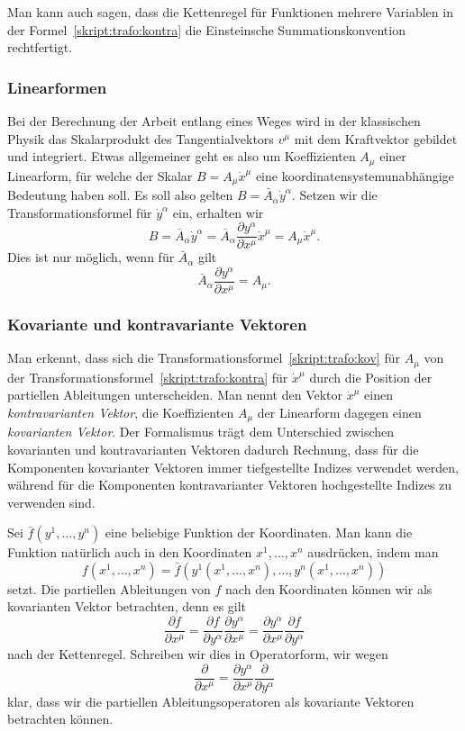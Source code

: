 Man kann auch sagen, dass die Kettenregel für Funktionen mehrere Variablen
in der Formel~\eqref{skript:trafo:kontra}
die Einsteinsche Summationskonvention rechtfertigt.

\subsubsection{Linearformen}
Bei der Berechnung der Arbeit entlang eines Weges wird in der klassischen
Physik das Skalarprodukt des Tangentialvektors $v^\mu$ mit dem Kraftvektor
gebildet und integriert.
Etwas allgemeiner geht es also um Koeffizienten $A_\mu$ einer Linearform,
für welche der Skalar $B=A_\mu\dot x^\mu$ eine koordinatensystemunabhängige
Bedeutung haben soll.
Es soll also gelten
$B=\bar A_\alpha \dot y^\alpha$.
Setzen wir die Transformationsformel für $\dot y^\alpha$ ein, erhalten
wir
\begin{equation}
B=\bar A_\alpha\dot y^\alpha
=
\bar A_\alpha \frac{\partial y^\alpha}{\partial x^\mu}\dot x^\mu
=
A_\mu\dot x^\mu.
\end{equation}
Dies ist nur möglich, wenn für $\bar A_\alpha$ gilt
\begin{equation}
\bar A_\alpha \frac{\partial y^\alpha}{\partial x^\mu}
= 
A_\mu.
\label{skript:trafo:kov}
\end{equation}

\subsubsection{Kovariante und kontravariante Vektoren}
Man erkennt, dass sich die Transformationsformel~\eqref{skript:trafo:kov}
für $A_\mu$ von der Transformationsformel~\eqref{skript:trafo:kontra}
für $\dot x^\mu$ durch die Position der partiellen Ableitungen unterscheiden.
Man nennt den Vektor $\dot x^\mu$ einen {\em kontravarianten Vektor},
die Koeffizienten $A_\mu$ der Linearform dagegen einen {\em kovarianten Vektor}.
Der Formalismus trägt dem Unterschied zwischen kovarianten und kontravarianten
Vektoren dadurch Rechnung, dass für die Komponenten kovarianter Vektoren
immer tiefgestellte Indizes verwendet werden, während für die Komponenten
kontravarianter Vektoren hochgestellte Indizes zu verwenden sind.

Sei $\bar f(y^1,\dots,y^n)$ eine beliebige Funktion der Koordinaten.
Man kann die Funktion natürlich auch in den Koordinaten $x^1,\dots,x^n$
ausdrücken, indem man 
\[
f(x^1,\dots,x^n) = \bar f(y^1(x^1,\dots,x^n),\dots, y^n(x^1,\dots,x^n))
\]
setzt.
Die partiellen Ableitungen von $f$ nach den Koordinaten können wir
als kovarianten Vektor betrachten, denn es gilt
\[
\frac{\partial f}{\partial x^\mu}
=
\frac{\partial f}{\partial y^\alpha}\frac{\partial y^\alpha}{\partial x^\mu}
=
\frac{\partial y^\alpha}{\partial x^\mu}
\frac{\partial f}{\partial y^\alpha}
\]
nach der Kettenregel.
Schreiben wir dies in Operatorform, wir wegen
\[
\frac{\partial}{\partial x^\mu}
=
\frac{\partial y^\alpha}{\partial x^\mu}
\frac{\partial}{\partial y^\alpha}
\]
klar, dass wir die partiellen Ableitungsoperatoren als kovariante Vektoren
betrachten können.

